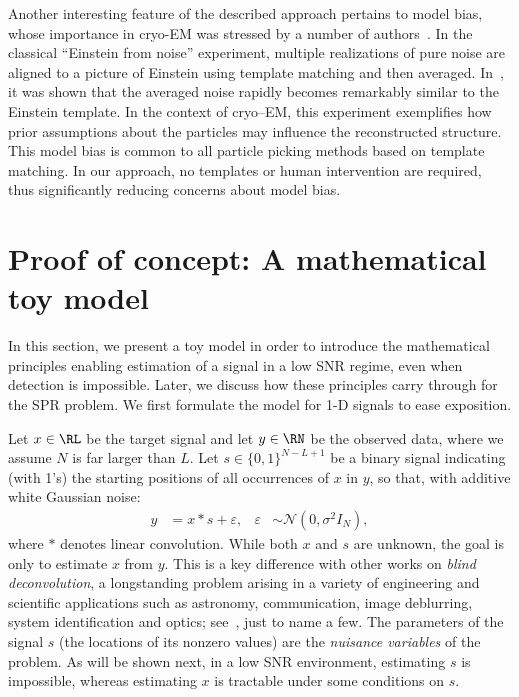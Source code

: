 \documentclass[9pt,twocolumn,twoside,lineno]{pnas-new}
\begin{document}
Another interesting feature of the described approach pertains to model bias, whose importance in cryo-EM was stressed by a number of authors~\cite{shatsky2009method,vanheel1992correlation,henderson2013avoiding,vanheel2013finding}. In the classical ``Einstein from noise'' experiment, multiple realizations of pure noise are aligned to a picture of Einstein using template matching and then averaged. In~\cite{shatsky2009method}, it was shown that the averaged noise rapidly becomes remarkably similar to the Einstein template. In the context of cryo--EM, this experiment exemplifies how prior assumptions about the particles may influence the reconstructed structure. This model bias is common to all particle picking methods based on template matching. In our approach, no templates or human intervention are required, thus significantly reducing concerns about model bias. %


\section{Proof of concept: A mathematical toy model}

In this section, we present a toy model in order to introduce the mathematical principles enabling estimation of a signal in a low SNR regime, even when detection is impossible. Later, we discuss how these principles carry through for the SPR problem. We first formulate the model for 1-D signals to ease exposition.

Let $x\in\RL$ be the target signal and let $y\in\RN$ be the observed data, where we assume $N$ is  far larger than $L$. Let  $s \in \{0, 1\}^{N-L+1}$ be a binary signal indicating (with 1's) the starting positions of all occurrences of $x$ in $y$, so that, with additive white Gaussian noise:
\begin{align}
y & =  x \ast s + \varepsilon, & \varepsilon & \sim \mathcal{N}(0,\sigma^2 I_N),
\label{eq:model}
\end{align}
where $\ast$ denotes linear convolution. 
While both $x$ and $s$ are unknown, the goal is only to estimate $x$ from $y$.
This is a key difference with other works on  \emph{blind deconvolution}, a longstanding problem arising in a variety of engineering and scientific applications such as astronomy, communication, image deblurring, system identification and optics; see~\cite{jefferies1993restoration,shalvi1990new,ayers1988iterative,abed1997blind}, just to name a few. 
The parameters of the signal $s$ (the locations of its nonzero values) are the \emph{nuisance variables} of the problem. As will be shown next, in a low SNR environment, estimating $s$ is impossible, whereas estimating $x$ is tractable under some conditions on $s$. 
\end{document}
